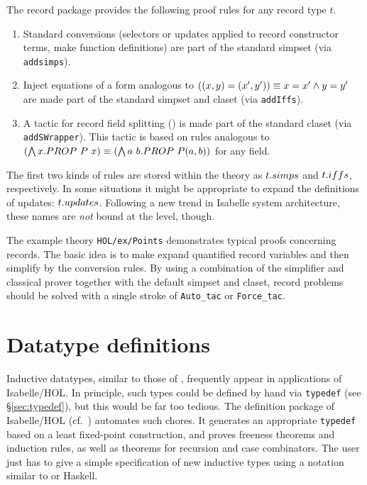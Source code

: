 The record package provides the following proof rules for any record type $t$.
\begin{enumerate}
  
\item Standard conversions (selectors or updates applied to record constructor
  terms, make function definitions) are part of the standard simpset (via
  \texttt{addsimps}).
  
\item Inject equations of a form analogous to $((x, y) = (x', y')) \equiv x=x'
  \wedge y=y'$ are made part of the standard simpset and claset (via
  \texttt{addIffs}).
  
\item A tactic for record field splitting () is made
  part of the standard claset (via \texttt{addSWrapper}).  This tactic is
  based on rules analogous to $(\bigwedge x. PROP~P~x) \equiv (\bigwedge a~b. PROP~P(a,
  b))$ for any field.
\end{enumerate}

The first two kinds of rules are stored within the theory as $t\mathord. simps$ and
$t\mathord. iffs$, respectively.  In some situations it might be appropriate to
expand the definitions of updates: $t\mathord. updates$.  Following a new trend in
Isabelle system architecture, these names are \emph{not} bound at the {\ML}
level, though.

\medskip

The example theory \texttt{HOL/ex/Points} demonstrates typical proofs
concerning records.  The basic idea is to make 
expand quantified record variables and then simplify by the conversion rules.
By using a combination of the simplifier and classical prover together with
the default simpset and claset, record problems should be solved with a single
stroke of \texttt{Auto_tac} or \texttt{Force_tac}.


\section{Datatype definitions}
\label{sec:HOL:datatype}

Inductive datatypes, similar to those of \ML, frequently appear in
applications of Isabelle/HOL.  In principle, such types could be defined by
hand via \texttt{typedef} (see \S\ref{sec:typedef}), but this would be far too
tedious.  The  definition package of Isabelle/HOL (cf.\ 
\cite{Berghofer-Wenzel:1999:TPHOL}) automates such chores.  It generates an
appropriate \texttt{typedef} based on a least fixed-point construction, and
proves freeness theorems and induction rules, as well as theorems for
recursion and case combinators.  The user just has to give a simple
specification of new inductive types using a notation similar to {\ML} or
Haskell.

